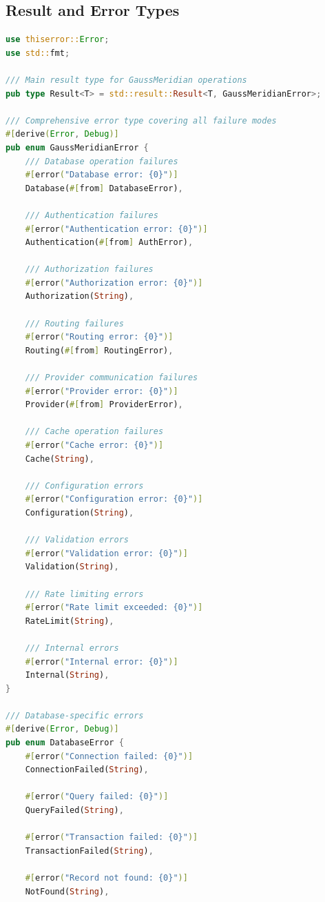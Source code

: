 \documentclass[12pt,a4paper,twoside]{report}
\begin{document}
\subsection{Result and Error Types}

\begin{lstlisting}[language=Rust,caption={Error Definitions - crates/gaussmeridian-core/src/error.rs}]
use thiserror::Error;
use std::fmt;

/// Main result type for GaussMeridian operations
pub type Result<T> = std::result::Result<T, GaussMeridianError>;

/// Comprehensive error type covering all failure modes
#[derive(Error, Debug)]
pub enum GaussMeridianError {
    /// Database operation failures
    #[error("Database error: {0}")]
    Database(#[from] DatabaseError),
    
    /// Authentication failures
    #[error("Authentication error: {0}")]
    Authentication(#[from] AuthError),
    
    /// Authorization failures
    #[error("Authorization error: {0}")]
    Authorization(String),
    
    /// Routing failures
    #[error("Routing error: {0}")]
    Routing(#[from] RoutingError),
    
    /// Provider communication failures
    #[error("Provider error: {0}")]
    Provider(#[from] ProviderError),
    
    /// Cache operation failures
    #[error("Cache error: {0}")]
    Cache(String),
    
    /// Configuration errors
    #[error("Configuration error: {0}")]
    Configuration(String),
    
    /// Validation errors
    #[error("Validation error: {0}")]
    Validation(String),
    
    /// Rate limiting errors
    #[error("Rate limit exceeded: {0}")]
    RateLimit(String),
    
    /// Internal errors
    #[error("Internal error: {0}")]
    Internal(String),
}

/// Database-specific errors
#[derive(Error, Debug)]
pub enum DatabaseError {
    #[error("Connection failed: {0}")]
    ConnectionFailed(String),
    
    #[error("Query failed: {0}")]
    QueryFailed(String),
    
    #[error("Transaction failed: {0}")]
    TransactionFailed(String),
    
    #[error("Record not found: {0}")]
    NotFound(String),
    

\end{lstlisting}
\end{document}
